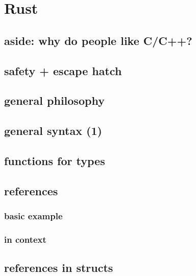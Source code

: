 

\section{Rust}

\subsection{aside: why do people like C/C++?}


\subsection{safety + escape hatch}




\subsection{general philosophy}


\subsection{general syntax (1)}


\subsection{functions for types}


\subsection{references}
\subsubsection{basic example}


\subsubsection{in context}


\subsection{references in structs}


